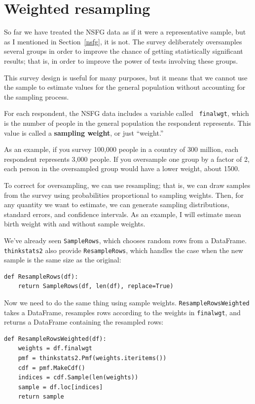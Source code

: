 \documentclass[12pt]{book}
\begin{document}
\section{Weighted resampling}

So far we have treated the NSFG data as if it were a representative
sample, but as I mentioned in Section~\ref{nsfg}, it is not.  The
survey deliberately oversamples several groups in order to
improve the chance of getting statistically significant results; that
is, in order to improve the power of tests involving these groups.

This survey design is useful for many purposes, but it means that we
cannot use the sample to estimate values for the general
population without accounting for the sampling process.

For each respondent, the NSFG data includes a variable called {\tt
  finalwgt}, which is the number of people in the general population
the respondent represents.  This value is called a {\bf sampling
  weight}, or just ``weight.''

As an example, if you survey 100,000 people in a country of 300
million, each respondent represents 3,000 people.  If you oversample
one group by a factor of 2, each person in the oversampled
group would have a lower weight, about 1500.

To correct for oversampling, we can use resampling; that is, we
can draw samples from the survey using probabilities proportional
to sampling weights.  Then, for any quantity we want to estimate, we can
generate sampling distributions, standard errors, and confidence
intervals.  As an example, I will estimate mean birth weight with
and without sample weights.

We've already seen {\tt SampleRows}, which chooses random rows
from a DataFrame.  {\tt thinkstats2} also provide {\tt ResampleRows},
which handles the case when the new sample is the same size as the original:

\begin{verbatim}
def ResampleRows(df):
    return SampleRows(df, len(df), replace=True)
\end{verbatim}

Now we need to do the same thing using sample weights.
{\tt ResampleRowsWeighted} takes a DataFrame, resamples rows according
to the weights in {\tt finalwgt}, and returns a DataFrame containing
the resampled rows:

\begin{verbatim}
def ResampleRowsWeighted(df):
    weights = df.finalwgt
    pmf = thinkstats2.Pmf(weights.iteritems())
    cdf = pmf.MakeCdf()
    indices = cdf.Sample(len(weights))
    sample = df.loc[indices]
    return sample
\end{verbatim}
\end{document}
